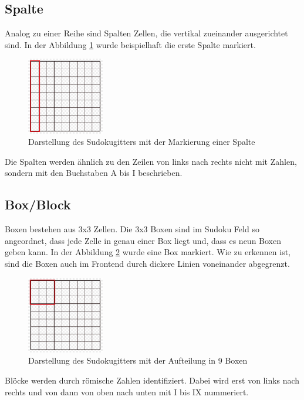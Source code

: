 \subsection{Spalte}
Analog zu einer Reihe sind Spalten Zellen, die vertikal zueinander ausgerichtet sind. In der Abbildung \ref{fig:SudokugitterSpalte} wurde beispielhaft die erste Spalte markiert.
\begin{figure}[H]
	\centering
	\includegraphics[width=0.3\textwidth]{images/sudokugitterSpalte.jpg}
	\caption{Darstellung des Sudokugitters mit der Markierung einer Spalte}
	\label{fig:SudokugitterSpalte}
\end{figure}
Die Spalten werden ähnlich zu den Zeilen von links nach rechts nicht mit Zahlen, sondern mit den Buchstaben A bis I beschrieben.

\subsection{Box/Block}
Boxen bestehen aus 3x3 Zellen. Die 3x3 Boxen sind im Sudoku Feld so angeordnet, dass jede Zelle in genau einer Box liegt und, dass es neun Boxen geben kann. In der Abbildung \ref{fig:SudokugitterBox} wurde eine Box markiert. Wie zu erkennen ist, sind die Boxen auch im Frontend durch dickere Linien voneinander abgegrenzt. 
\begin{figure}[H]
	\centering
	\includegraphics[width=0.3\textwidth]{images/sudokugitterBox.jpg}
	\caption{Darstellung des Sudokugitters mit der Aufteilung in 9 Boxen}
	\label{fig:SudokugitterBox}
\end{figure}
Blöcke werden durch römische Zahlen identifiziert. Dabei wird erst von links nach rechts und von dann von oben nach unten mit I bis IX nummeriert.

